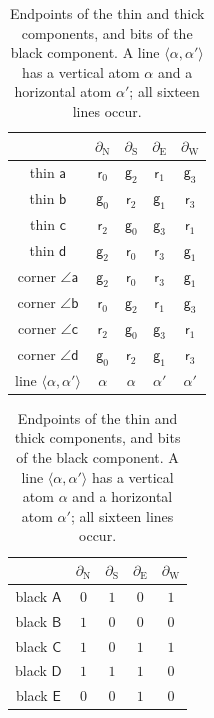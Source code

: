 \begin{table}[ht]
\centering
\begin{tabular}{c|cccc}
 & $\partial_{\mathrm N}$ & $\partial_{\mathrm S}$ & $\partial_{\mathrm E}$ & $\partial_{\mathrm W}$\\\hline
thin $\mathsf a$ & $\mathsf r_0$ & $\mathsf g_2$ & $\mathsf r_1$ & $\mathsf g_3$\\
thin $\mathsf b$ & $\mathsf g_0$ & $\mathsf r_2$ & $\mathsf g_1$ & $\mathsf r_3$\\
thin $\mathsf c$ & $\mathsf r_2$ & $\mathsf g_0$ & $\mathsf g_3$ & $\mathsf r_1$\\
thin $\mathsf d$ & $\mathsf g_2$ & $\mathsf r_0$ & $\mathsf r_3$ & $\mathsf g_1$\\\hline
corner $\angle\mathsf a$ & $\mathsf g_2$ & $\mathsf r_0$ & $\mathsf r_3$ & $\mathsf g_1$\\
corner $\angle\mathsf b$ & $\mathsf r_0$ & $\mathsf g_2$ & $\mathsf r_1$ & $\mathsf g_3$\\
corner $\angle\mathsf c$ & $\mathsf r_2$ & $\mathsf g_0$ & $\mathsf g_3$ & $\mathsf r_1$\\
corner $\angle\mathsf d$ & $\mathsf g_0$ & $\mathsf r_2$ & $\mathsf g_1$ & $\mathsf r_3$\\\hline
line $\langle\alpha,\alpha'\rangle$ & $\alpha$ & $\alpha$ & $\alpha'$ & $\alpha'$
\end{tabular}
\qquad
\begin{tabular}{c|cccc}
 & $\partial_{\mathrm N}$ & $\partial_{\mathrm S}$ & $\partial_{\mathrm E}$ & $\partial_{\mathrm W}$\\\hline
black $\mathsf A$ & $0$ & $1$ & $0$ & $1$\\
black $\mathsf B$ & $1$ & $0$ & $0$ & $0$\\
black $\mathsf C$ & $1$ & $0$ & $1$ & $1$\\
black $\mathsf D$ & $1$ & $1$ & $1$ & $0$\\
black $\mathsf E$ & $0$ & $0$ & $1$ & $0$
\end{tabular}
\caption{Endpoints of the thin and thick components, and bits of the black component. A line $\langle\alpha,\alpha'\rangle$ has a vertical atom $\alpha$ and a horizontal atom $\alpha'$; all sixteen lines occur.}
\label{tab:edges}
\end{table}

